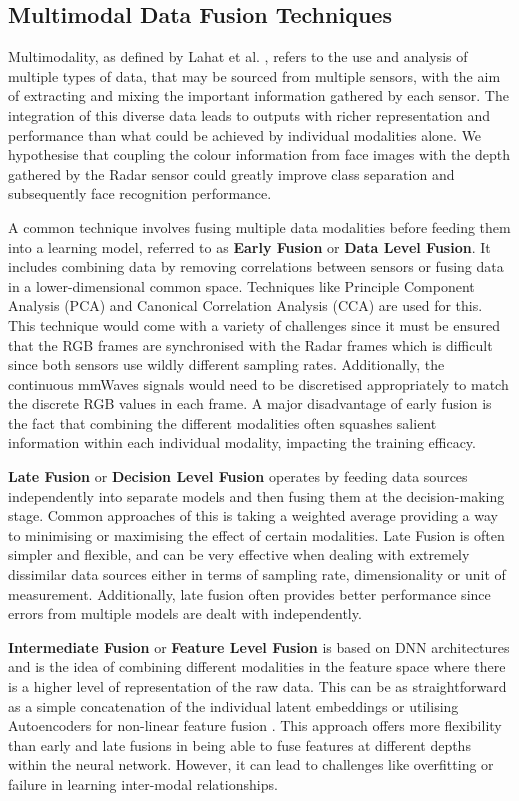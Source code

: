 \documentclass{interim}
\begin{document}
\subsection{Multimodal Data Fusion Techniques}
Multimodality, as defined by Lahat et al. \cite{lahat2015multimodal}, refers to the use and analysis of multiple types of data, that may be sourced from multiple sensors, with the aim of extracting and mixing the important information gathered by each sensor. The integration of this diverse data leads to outputs with richer representation and performance than what could be achieved by individual modalities alone. We hypothesise that coupling the colour information from face images with the depth gathered by the Radar sensor could greatly improve class separation and subsequently face recognition performance.

A common technique involves fusing multiple data modalities before feeding them into a learning model, referred to as \textbf{Early Fusion} or \textbf{Data Level Fusion}. It includes combining data by removing correlations between sensors or fusing data in a lower-dimensional common space. Techniques like Principle Component Analysis (PCA) and Canonical Correlation Analysis (CCA) are used for this. This technique would come with a variety of challenges since it must be ensured that the RGB frames are synchronised with the Radar frames which is difficult since both sensors use wildly different sampling rates. Additionally, the continuous mmWaves signals would need to be discretised appropriately to match the discrete RGB values in each frame. A major disadvantage of early fusion is the fact that combining the different modalities often squashes salient information within each individual modality, impacting the training efficacy.

\textbf{Late Fusion} or \textbf{Decision Level Fusion} operates by feeding data sources independently into separate models and then fusing them at the decision-making stage. Common approaches of this is taking a weighted average providing a way to minimising or maximising the effect of certain modalities. Late Fusion is often simpler and flexible, and can be very effective when dealing with extremely dissimilar data sources either in terms of sampling rate, dimensionality or unit of measurement. Additionally, late fusion often provides better performance since errors from multiple models are dealt with independently.

\textbf{Intermediate Fusion} or \textbf{Feature Level Fusion} is based on DNN architectures and is the idea of combining different modalities in the feature space where there is a higher level of representation of the raw data. This can be as straightforward as a simple concatenation of the individual latent embeddings or utilising Autoencoders for non-linear feature fusion \cite{charte2018practical}. This approach offers more flexibility than early and late fusions in being able to fuse features at different depths within the neural network. However, it can lead to challenges like overfitting or failure in learning inter-modal relationships.
\end{document}
